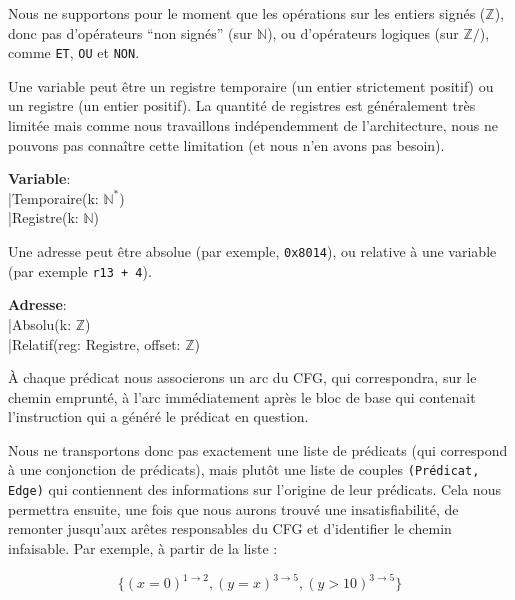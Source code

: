 \documentclass[french]{article}
\begin{document}
  Nous ne supportons pour le moment que les opérations sur les entiers signés ($\mathds{Z}$), donc pas d'opérateurs ``non signés'' (sur $\mathds{N}$), ou d'opérateurs logiques (sur $\mathds{Z}/$), comme \texttt{ET}, \texttt{OU} et \texttt{NON}.

  Une variable peut être un registre temporaire (un entier strictement positif) ou un registre (un entier positif). La quantité de registres est généralement très limitée mais comme nous travaillons indépendemment de l'architecture, nous ne pouvons pas connaître cette limitation (et nous n'en avons pas besoin).

  \begin{algorithm}[H]
        \textbf{Variable}:\\
            \qquad |\quad Temporaire(k: $\mathds{N^*}$)\\
            \qquad |\quad Registre(k: $\mathds{N}$)\\
  \end{algorithm}

  Une adresse peut être absolue (par exemple, \texttt{0x8014}), ou relative à une variable (par exemple \texttt{r13 + 4}).

  \begin{algorithm}[H]
        \textbf{Adresse}:\\
            \qquad |\quad Absolu(k: $\mathds{Z}$)\\
            \qquad |\quad Relatif(reg: Registre, offset: $\mathds{Z}$)\\
  \end{algorithm}

  \bigbreak


  \`A chaque prédicat nous associerons un arc du CFG, qui correspondra, sur le chemin emprunté, à l'arc immédiatement après le bloc de base qui contenait l'instruction qui a généré le prédicat en question.

  Nous ne transportons donc pas exactement une liste de prédicats (qui correspond à une conjonction de prédicats), mais plutôt une liste de couples \texttt{(Prédicat, Edge)} qui contiennent des informations sur l'origine de leur prédicats. Cela nous permettra ensuite, une fois que nous aurons trouvé une insatisfiabilité, de remonter jusqu'aux arêtes responsables du CFG et d'identifier le chemin infaisable. Par exemple, à partir de la liste :

  \[\{(x = 0)^{1\rightarrow 2}, (y = x)^{3\rightarrow 5}, (y > 10)^{3\rightarrow 5} \}\]
\end{document}
